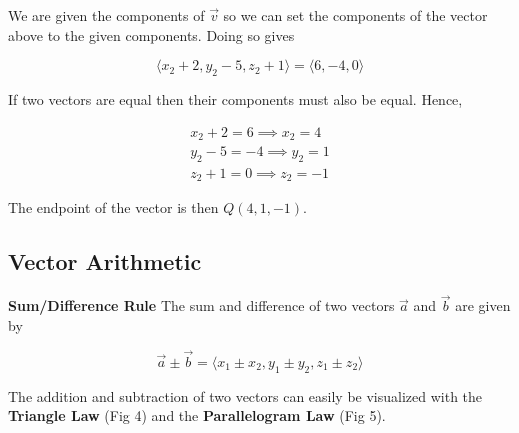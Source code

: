         \noindent We are given the components of $\overrightarrow{v}$ so we can set the components
        of the vector above to the given components. Doing so gives

        \begin{equation*}
            \langle x_2+2,y_2-5,z_2+1\rangle=\langle6,-4,0\rangle
        \end{equation*}

        \noindent If two vectors are equal then their components must also be equal. Hence,

        \begin{center}
            \begin{align*}
                x_2+2=6\implies x_2=4\\
                y_2-5=-4\implies y_2=1\\
                z_2+1=0\implies z_2=-1
            \end{align*}
        \end{center}

        \noindent The endpoint of the vector is then $Q(4,1,-1)$.



    \subsection{Vector Arithmetic}
        \textbf{Sum/Difference Rule} The sum and difference of two vectors $\overrightarrow{a}$
        and $\overrightarrow{b}$ are given by

        \begin{equation}
            \overrightarrow{a}\pm\overrightarrow{b}=\langle x_1\pm x_2, y_1 \pm y_2, z_1 \pm z_2\rangle
        \end{equation}

        \noindent The addition and subtraction of two vectors can easily be visualized with the
        \textbf{Triangle Law} (Fig 4) and the \textbf{Parallelogram Law} (Fig 5).

